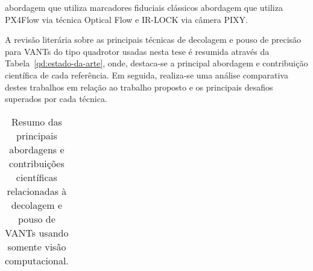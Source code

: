     abordagem que utiliza marcadores fiduciais clássicos
    abordagem que utiliza PX4Flow via técnica Optical Flow e IR-LOCK via câmera PIXY. 
    
	A revisão literária sobre as principais técnicas de decolagem e pouso de precisão para VANTs do tipo quadrotor usadas nesta tese é resumida através da Tabela~\ref{qd:estado-da-arte}, onde, destaca-se a principal abordagem e contribuição científica de cada referência. Em seguida, realiza-se uma análise comparativa destes trabalhos em relação ao trabalho proposto e os principais desafios superados por cada técnica. 
	
    \begin{table}[h]
    \centering
	\caption{Resumo das principais abordagens e contribuições científicas relacionadas à decolagem e pouso de VANTs usando somente visão computacional.}
		\begin{tabular}{ccc}
		   

\end{tabular}
\end{table}
